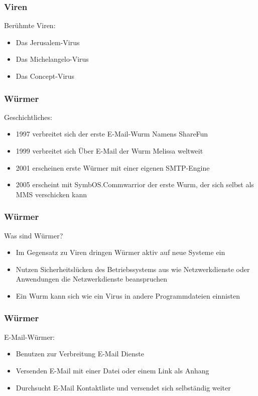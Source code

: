 \documentclass{beamer}
\begin{document}
\begin{frame}
	\frametitle{Viren}
	\begin{block}{Berühmte Viren:}
		\begin{itemize}
			\item Das Jerusalem-Virus
			\item Das Michelangelo-Virus
			\item Das Concept-Virus
		\end{itemize}
	\end{block}			
\end{frame}

\begin{frame}
	\frametitle{Würmer}
		\begin{block}{Geschichtliches:}
			\begin{itemize}
				\item 1997 verbreitet sich der erste E-Mail-Wurm Namens ShareFun
				\item 1999 verbreitet sich Über E-Mail der Wurm Melissa weltweit
				\item 2001 erscheinen erste Würmer mit einer eigenen SMTP-Engine
				\item 2005 erscheint mit SymbOS.Commwarrior der erste Wurm, der sich selbst als MMS verschicken kann
			\end{itemize}
		\end{block}
\end{frame}

\begin{frame}
	\frametitle{Würmer}
		\begin{block}{Was sind Würmer?}
			\begin{itemize}
				\item Im Gegensatz zu Viren dringen Würmer aktiv auf neue Systeme ein
				\item Nutzen Sicherheitslücken des Betriebssystems aus wie Netzwerkdienste oder Anwendungen die Netzwerkdienste beanspruchen
				\item Ein Wurm kann sich wie ein Virus in andere Programmdateien einnisten
			\end{itemize}
		\end{block}
\end{frame}

\begin{frame}
	\frametitle{Würmer}
		\begin{block}{E-Mail-Würmer:}
			\begin{itemize}
				\item Benutzen zur Verbreitung E-Mail Dienste
				\item Versenden E-Mail mit einer Datei oder einem Link als Anhang
				\item Durchsucht E-Mail Kontaktliste und versendet sich selbständig weiter
			\end{itemize}
		\end{block}
\end{frame}
\end{document}
